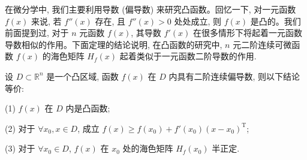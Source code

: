 在微分学中, 我们主要利用导数 (偏导数) 来研究凸函数。回忆一下, 对一元函数 $f(x)$ 来说, 若 $f''(x)$ 存在, 且 $f''(x)>0$ 处处成立, 则 $f(x)$ 是凸的。我们前面提到过, 对于 $n$ 元函数 $f(x)$, 其导数 $f'(x)$ 在很多情形下将起着一元函数导数相似的作用。下面定理的结论说明, 在凸函数的研究中, $n$ 元二阶连续可微函数 $f(x)$ 的海色矩阵 $H_f(x)$ 起着类似于一元函数二阶导数的作用.

\begin{theorem}\label{theorem:ma-14-6-1}
设 $D\subset\mathbb R^n$ 是一个凸区域, 函数 $f(x)$ 在 $D$ 内具有二阶连续偏导数, 则以下结论等价:

(1) $f(x)$ 在 $D$ 内是凸函数;

(2) 对于 $\forall x_0,x\in D$, 成立 $f(x)\geqslant f(x_0)+f'(x_0)(x-x_0)^{\mathrm T}$;

(3) 对于 $\forall x_0\in D$, $f(x)$ 在 $x_0$ 处的海色矩阵 $H_f(x_0)$ 半正定.
\end{theorem}


